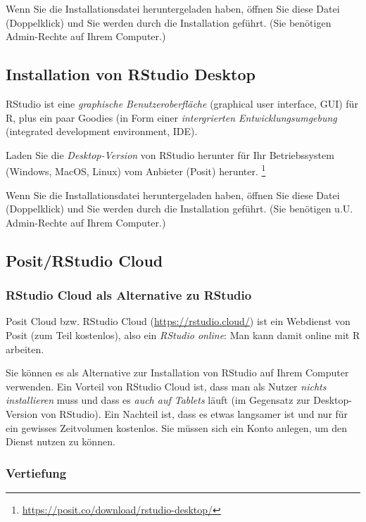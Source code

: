 \documentclass[
  letterpaper,
]{scrbook}
\theoremstyle{definition}
\theoremstyle{definition}
\theoremstyle{definition}
\theoremstyle{remark}
\begin{document}
Wenn Sie die Installationsdatei heruntergeladen haben, öffnen Sie diese
Datei (Doppelklick) und Sie werden durch die Installation geführt. (Sie
benötigen Admin-Rechte auf Ihrem Computer.)

\subsection{Installation von RStudio
Desktop}\label{installation-von-rstudio-desktop}

RStudio ist eine \emph{graphische Benutzeroberfläche} (graphical user
interface, GUI) für R, plus ein paar Goodies (in Form einer
\emph{intergrierten Entwicklungsumgebung} (integrated development
environment, IDE).

Laden Sie die \emph{Desktop-Version} von RStudio herunter für Ihr
Betriebssystem (Windows, MacOS, Linux) vom Anbieter (Posit) herunter.
\footnote{\url{https://posit.co/download/rstudio-desktop/}}

Wenn Sie die Installationsdatei heruntergeladen haben, öffnen Sie diese
Datei (Doppelklick) und Sie werden durch die Installation geführt. (Sie
benötigen u.U. Admin-Rechte auf Ihrem Computer.)

\subsection{Posit/RStudio Cloud}\label{positrstudio-cloud}

\subsubsection{RStudio Cloud als Alternative zu
RStudio}\label{rstudio-cloud-als-alternative-zu-rstudio}

Posit Cloud bzw. RStudio Cloud (\url{https://rstudio.cloud/}) ist ein
Webdienst von Posit (zum Teil kostenlos), also ein \emph{RStudio
online}: Man kann damit online mit R arbeiten.

Sie können es als Alternative zur Installation von RStudio auf Ihrem
Computer verwenden. Ein Vorteil von RStudio Cloud ist, dass man als
Nutzer \emph{nichts installieren} muss und dass es \emph{auch auf
Tablets} läuft (im Gegensatz zur Desktop-Version von RStudio). Ein
Nachteil ist, dass es etwas langsamer ist und nur für ein gewisses
Zeitvolumen kostenlos. Sie müssen sich ein Konto anlegen, um den Dienst
nutzen zu können.

\subsubsection{Vertiefung}\label{vertiefung-1}
\end{document}
